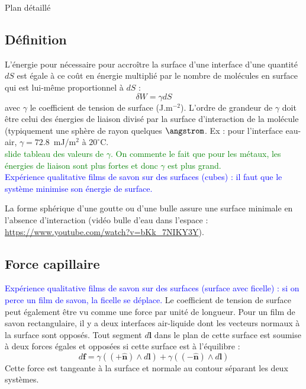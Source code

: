 \begin{reportBlock}{Plan détaillé}
  \subsection{Définition}
  L'énergie pour nécessaire pour accroître la surface d'une interface d'une quantité $dS$ est égale à ce coût en énergie multiplié par le nombre de molécules en surface qui est lui-même proportionnel à $dS$ :
  \begin{equation}
      \delta W = \gamma dS
  \end{equation}
  avec $\gamma$ le coefficient de tension de surface (J.m$^{-2}$). L'ordre de grandeur de $\gamma$ doit être celui des énergies de liaison divisé par la surface d'interaction de la molécule (typiquement une sphère de rayon quelques $\angstrom$. Ex : pour l'interface eau-air, $\gamma = 72.8$~mJ/m$^2$ à $20^{\circ}$C. \\
  
  \textcolor{green}{slide tableau des valeurs de $\gamma$. On commente le fait que pour les métaux, les énergies de liaison sont plus fortes et donc $\gamma$ est plus grand.}\\

  \textcolor{blue}{Expérience qualitative films de savon sur des surfaces (cubes) : il faut que le système minimise son énergie de surface.}

   La forme sphérique d'une goutte ou d'une bulle assure une surface minimale en l'absence d'interaction (vidéo bulle d'eau dans l'espace : \url{https://www.youtube.com/watch?v=bKk_7NIKY3Y}).
   
  \subsection{Force capillaire}

  \textcolor{blue}{Expérience qualitative films de savon sur des surfaces (surface avec ficelle) : si on perce un film de savon, la ficelle se déplace.}
  Le coefficient de tension de surface peut également être vu comme une force par unité de longueur. Pour un film de savon rectangulaire, il y a deux interfaces air-liquide dont les vecteurs normaux à la surface sont opposés. Tout segment $d\mathbf{l}$ dans le plan de cette surface est soumise à deux forces égales et opposées si cette surface est à l'équilibre  :
  \begin{equation}
      d\mathbf{f} = \gamma((\mathbf{+\hat{n}})\wedge d\mathbf{l}) +\gamma((\mathbf{-\hat{n}})\wedge d\mathbf{l})
  \end{equation}
  Cette force est tangeante à la surface et normale au contour séparant les deux systèmes.\\
  

\end{reportBlock}
